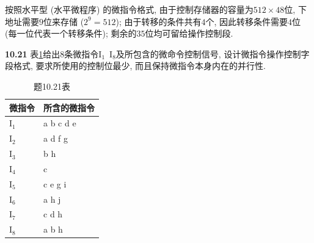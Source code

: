 \documentclass[UTF8]{report}
\newcommand{\problem}[1]{{\setlength{\parskip}{10pt}\noindent \bf{#1}}}
\newenvironment{solution}{{\noindent\hskip 2em \bf 解 \quad}}{}
\begin{document}
\begin{solution}
    按照水平型 (水平微程序) 的微指令格式, 由于控制存储器的容量为$512 \times 48$位, 下地址需要$9$位来存储 ($2^9=512$); 由于转移的条件共有$4$个, 因此转移条件需要$4$位 (每一位代表一个转移条件); 剩余的$35$位均可留给操作控制段.
\end{solution}


\problem{10.21} 表\ref{tab:10_21_1}给出$8$条微指令$\mathrm{I_1}$~$\mathrm{I_8}$及所包含的微命令控制信号, 设计微指令操作控制字段格式, 要求所使用的控制位最少, 而且保持微指令本身内在的并行性. 
\begin{table}[htbp]
    \centering
    \caption{题10.21表}
    \begin{tabular}{l|l}
        \hline
        微指令 & 所含的微指令 \bigstrut\\
        \hline
        $\mathrm{I_1}$ & a b c d e \bigstrut\\
        \hline
        $\mathrm{I_2}$ & a d f g \bigstrut\\
        \hline
        $\mathrm{I_3}$ & b h \bigstrut\\
        \hline
        $\mathrm{I_4}$ & c \bigstrut\\
        \hline
        $\mathrm{I_5}$ & c e g i \bigstrut\\
        \hline
        $\mathrm{I_6}$ & a h j \bigstrut\\
        \hline
        $\mathrm{I_7}$ & c d h \bigstrut\\
        \hline
        $\mathrm{I_8}$ & a b h \bigstrut\\
        \hline
    \end{tabular}%
    \label{tab:10_21_1}%
\end{table}%
\end{document}
